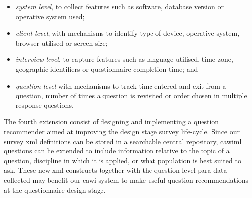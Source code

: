 	\begin{itemize}
		\item \emph{system level}, to collect features such as software, database version or operative system used;
		\item \emph{client level}, with mechanisms to identify type of device, operative system, browser utilised or screen size;
		\item \emph{interview level}, to capture features such as language utilised, time zone, geographic identifiers or questionnaire completion time; and 
		\item \emph{question level} with mechanisms to track time entered and exit from a question, number of times a question is revisited or order chosen in multiple response questions.
	\end{itemize}

	The fourth extension consist of designing and implementing a question recommender aimed at improving the design stage survey life-cycle. Since our survey \gls{xml} definitions can be stored in a searchable central repository, \gls{cawiml} questions can be extended to include information relative to the topic of a question, discipline in which it is applied, or what population is best suited to ask. These new \gls{xml} constructs together with the question level para-data collected may benefit our \gls{cawi} system to make useful question recommendations at the questionnaire design stage.